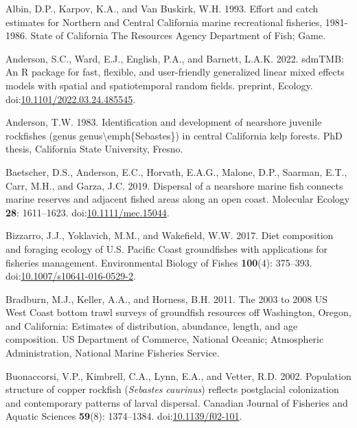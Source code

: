 \documentclass[11pt,
  english,
  letterpaper,
]{article}
\newlength{\cslhangindent}
\newenvironment{CSLReferences}[2] %
 {%
  \setlength{\parindent}{0pt}
  \ifodd #1 \everypar{\setlength{\hangindent}{\cslhangindent}}\ignorespaces\fi
  \ifnum #2 > 0
  \setlength{\parskip}{#2\baselineskip}
  \fi
 }%
 {}
\begin{document}
\hypertarget{refs}{}
\begin{CSLReferences}{1}{0}
\leavevmode{}%
Albin, D.P., Karpov, K.A., and Van Buskirk, W.H. 1993. Effort and catch estimates for {Northern} and {Central} {California} marine recreational fisheries, 1981-1986. State of California The Resources Agency Department of Fish; Game.

\leavevmode{}%
Anderson, S.C., Ward, E.J., English, P.A., and Barnett, L.A.K. 2022. {sdmTMB}: An {R} package for fast, flexible, and user-friendly generalized linear mixed effects models with spatial and spatiotemporal random fields. preprint, Ecology. doi:\href{https://doi.org/10.1101/2022.03.24.485545}{10.1101/2022.03.24.485545}.

\leavevmode{}%
Anderson, T.W. 1983. Identification and development of nearshore juvenile rockfishes (genus genus{\textbackslash{}}emph\{{Sebastes}\}) in central {California} kelp forests. PhD thesis, California State University, Fresno.

\leavevmode{}%
Baetscher, D.S., Anderson, E.C., Horvath, E.A.G., Malone, D.P., Saarman, E.T., Carr, M.H., and Garza, J.C. 2019. Dispersal of a nearshore marine fish connects marine reserves and adjacent fished areas along an open coast. Molecular Ecology \textbf{28}: 1611--1623. doi:\href{https://doi.org/10.1111/mec.15044}{10.1111/mec.15044}.

\leavevmode{}%
Bizzarro, J.J., Yoklavich, M.M., and Wakefield, W.W. 2017. Diet composition and foraging ecology of {U}.{S}. {Pacific} {Coast} groundfishes with applications for fisheries management. Environmental Biology of Fishes \textbf{100}(4): 375--393. doi:\href{https://doi.org/10.1007/s10641-016-0529-2}{10.1007/s10641-016-0529-2}.

\leavevmode{}%
Bradburn, M.J., Keller, A.A., and Horness, B.H. 2011. The 2003 to 2008 {US} {West} {Coast} bottom trawl surveys of groundfish resources off {Washington}, {Oregon}, and {California}: Estimates of distribution, abundance, length, and age composition. US Department of Commerce, National Oceanic; Atmospheric Administration, National Marine Fisheries Service.

\leavevmode{}%
Buonaccorsi, V.P., Kimbrell, C.A., Lynn, E.A., and Vetter, R.D. 2002. Population structure of copper rockfish (\emph{{Sebastes} caurinus}) reflects postglacial colonization and contemporary patterns of larval dispersal. Canadian Journal of Fisheries and Aquatic Sciences \textbf{59}(8): 1374--1384. doi:\href{https://doi.org/10.1139/f02-101}{10.1139/f02-101}.


\end{CSLReferences}
\end{document}
